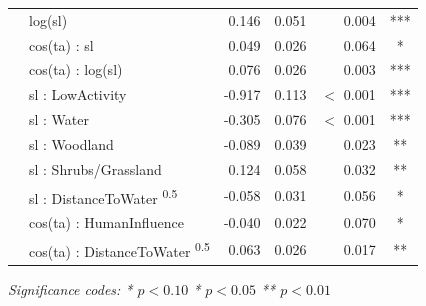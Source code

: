 \documentclass[abstract=off,10pt,a4paper,bibliography=totocnumbered]{article}
\begin{document}
\begin{table}[htbp]
\begin{center}
{\begin{threeparttable}
\begin{tabular}{llrrrc}
            & log(sl)                                         & 0.146       & 0.051 & 0.004       & ***   \\
            & cos(ta) : sl                                    & 0.049       & 0.026 & 0.064       & *     \\
            & cos(ta) : log(sl)                               & 0.076       & 0.026 & 0.003       & ***   \\
            & sl : LowActivity                                & -0.917      & 0.113 & \(<\) 0.001 & ***   \\
     \hdashline
     \multirow{5}{*}{Interactions}
            & sl : Water                                      & -0.305      & 0.076 & \(<\) 0.001 & ***   \\
            & sl : Woodland                                   & -0.089      & 0.039 & 0.023       & **    \\
            & sl : Shrubs/Grassland                           & 0.124       & 0.058 & 0.032       & **    \\
            & sl : DistanceToWater \textsuperscript{0.5}      & -0.058      & 0.031 & 0.056       & *     \\
            & cos(ta) : HumanInfluence                        & -0.040      & 0.022 & 0.070       & *     \\
            & cos(ta) : DistanceToWater \textsuperscript{0.5} & 0.063       & 0.026 & 0.017       & **    \\
     \bottomrule
    \end{tabular}
    \begin{tablenotes}
     \item \textit{Significance codes: * \(p < 0.10\) \quad ** \(p < 0.05\)
      \quad *** \(p < 0.01\)}
    \end{tablenotes}
   \end{threeparttable}
  }
 \end{center}
\end{table}


\newpage
\end{document}
